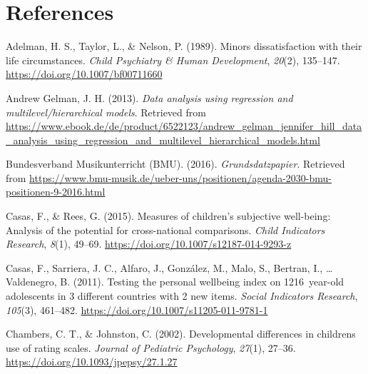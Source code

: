 \documentclass[a4, 12pt]{article}
\begin{document}
\label{sec:conclusion}

\clearpage

\hypertarget{references}{%
\section*{References}\label{references}}

\singlespacing

\setlength{\parindent}{-0.5in}
\setlength{\leftskip}{0.5in}
\setlength{\parskip}{8pt}

\noindent

\hypertarget{refs}{}
\leavevmode\hypertarget{ref-Adelman1989}{}%
Adelman, H. S., Taylor, L., \& Nelson, P. (1989). Minors dissatisfaction with their life circumstances. \emph{Child Psychiatry \& Human Development}, \emph{20}(2), 135--147. \url{https://doi.org/10.1007/bf00711660}

\leavevmode\hypertarget{ref-AndrewGelman2013}{}%
Andrew Gelman, J. H. (2013). \emph{Data analysis using regression and multilevel/hierarchical models}. Retrieved from \url{https://www.ebook.de/de/product/6522123/andrew_gelman_jennifer_hill_data_analysis_using_regression_and_multilevel_hierarchical_models.html}

\leavevmode\hypertarget{ref-BundesverbandMusikunterricht}{}%
Bundesverband Musikunterricht (BMU). (2016). \emph{Grundsdatzpapier}. Retrieved from \url{https://www.bmu-musik.de/ueber-uns/positionen/agenda-2030-bmu-positionen-9-2016.html}

\leavevmode\hypertarget{ref-Casas2015}{}%
Casas, F., \& Rees, G. (2015). Measures of children's subjective well-being: Analysis of the potential for cross-national comparisons. \emph{Child Indicators Research}, \emph{8}(1), 49--69. \url{https://doi.org/10.1007/s12187-014-9293-z}

\leavevmode\hypertarget{ref-Casas2011}{}%
Casas, F., Sarriera, J. C., Alfaro, J., González, M., Malo, S., Bertran, I., \ldots{} Valdenegro, B. (2011). Testing the personal wellbeing index on 1216~year-old adolescents in 3 different countries with 2 new items. \emph{Social Indicators Research}, \emph{105}(3), 461--482. \url{https://doi.org/10.1007/s11205-011-9781-1}

\leavevmode\hypertarget{ref-Johnston2002}{}%
Chambers, C. T., \& Johnston, C. (2002). Developmental differences in childrens use of rating scales. \emph{Journal of Pediatric Psychology}, \emph{27}(1), 27--36. \url{https://doi.org/10.1093/jpepsy/27.1.27}
\end{document}
